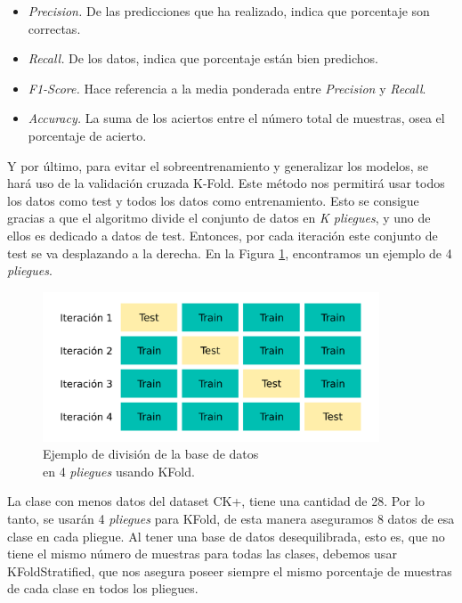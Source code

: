 \begin{itemize}
    \item \textit{Precision.} De las predicciones que ha realizado, indica que porcentaje son correctas.
    \item \textit{Recall.} De los datos, indica que porcentaje están bien predichos.
    \item \textit{F1-Score.} Hace referencia a la media ponderada entre \textit{Precision} y \textit{Recall}.
    \item \textit{Accuracy.} La suma de los aciertos entre el número total de muestras, osea el porcentaje de acierto.
\end{itemize}

Y por último, para evitar el sobreentrenamiento y generalizar los modelos, se hará uso de la validación cruzada K-Fold. Este método nos permitirá usar todos los datos como test y todos los datos como entrenamiento. Esto se consigue gracias a que el algoritmo divide el conjunto de datos en \textit{K pliegues}, y uno de ellos es dedicado a datos de test. Entonces, por cada iteración este conjunto de test se va desplazando a la derecha. En la Figura \ref{fig:kfolf_explicacion}, encontramos un ejemplo de 4 \textit{pliegues}.\\

\begin{figure} [h!]
  \begin{center}
    \includegraphics[width=10cm]{figs/KFold_explanation.png}
  \end{center}
  \captionsetup{justification=centering}
  \caption{Ejemplo de división de la base de datos \\
  en 4 \textit{pliegues} usando KFold.}
  \label{fig:kfolf_explicacion}
\end{figure}

La clase con menos datos del dataset CK+, tiene una cantidad de 28. Por lo tanto, se usarán 4 \textit{pliegues} para KFold, de esta manera aseguramos 8 datos de esa clase en cada pliegue. Al tener una base de datos desequilibrada, esto es, que no tiene el mismo número de muestras para todas las clases, debemos usar KFoldStratified, que nos asegura poseer siempre el mismo porcentaje de muestras de cada clase en todos los pliegues.\\

